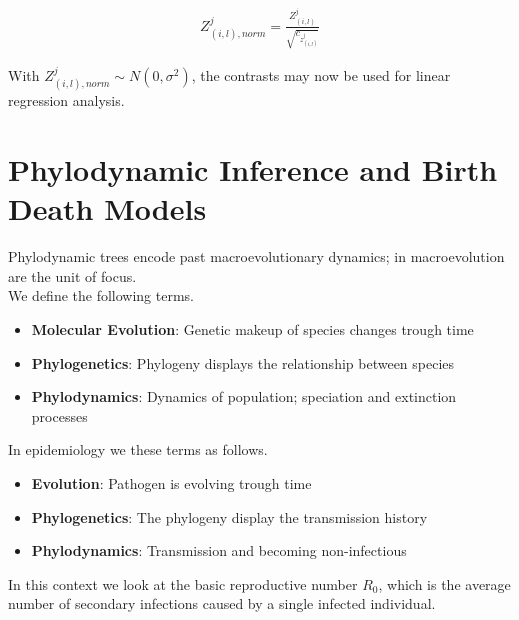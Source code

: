 \documentclass{article}
\begin{document}
\begin{multicols*}{3}
\begin{align*}
    Z^j_{(i,l), norm} = \frac{Z^j_{(i,l)}}{\sqrt{c_{z^j_{(i,l)}}}}
\end{align*}

With $Z^j_{(i,l), norm} \sim N(0, \sigma ^2)$, the contrasts may now be used for linear regression analysis. 

\section{Phylodynamic Inference and Birth Death Models}

Phylodynamic trees encode past macroevolutionary dynamics; in macroevolution are the unit of focus.\\
We define the following terms.
\begin{itemize}
    \item \textbf{Molecular Evolution}: Genetic makeup of species changes trough time 
    \item \textbf{Phylogenetics}: Phylogeny displays the relationship between species
    \item \textbf{Phylodynamics}: Dynamics of population; speciation and extinction processes 
\end{itemize}

In epidemiology we these terms as follows. 

\begin{itemize}
    \item \textbf{Evolution}: Pathogen is evolving trough time
    \item \textbf{Phylogenetics}: The phylogeny display the transmission history
    \item \textbf{Phylodynamics}: Transmission and becoming non-infectious
\end{itemize}

In this context we look at the basic reproductive number $R_0$, which is the average number of secondary infections caused by a single infected individual.\\


\end{multicols*}
\end{document}

